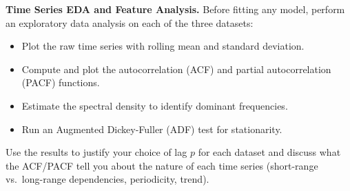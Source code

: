 \begin{questions}
    \item \textbf{Time Series EDA and Feature Analysis.}\;
    Before fitting any model, perform an exploratory data analysis on each of the three datasets:
    \begin{itemize}
        \item Plot the raw time series with rolling mean and standard deviation.
        \item Compute and plot the autocorrelation (ACF) and partial autocorrelation (PACF) functions.
        \item Estimate the spectral density to identify dominant frequencies.
        \item Run an Augmented Dickey-Fuller (ADF) test for stationarity.
    \end{itemize}
    Use the results to justify your choice of lag $p$ for each dataset and discuss what the ACF/PACF tell you about the nature of each time series (short-range vs.\ long-range dependencies, periodicity, trend).
\end{questions}
